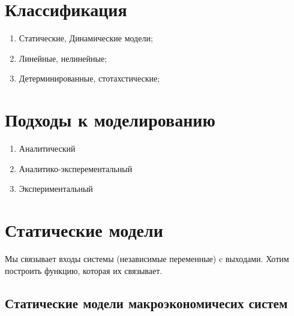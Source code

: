 \documentclass[14pt]{extarticle}
\begin{document}
	\section{Классификация}
	\begin{enumerate}
		\item Статические, Динамические модели;
		\item Линейные, нелинейные;
		\item Детерминированные, стотахстические;
	\end{enumerate}
	\section{Подходы к моделированию}
	\begin{enumerate}
		\item Аналитический
		\item Аналитико-эксперементальный
		\item Экспериментальный
	\end{enumerate}
	\section{Статические модели}
	Мы связывает входы системы (независимые переменные) c
	выходами. Хотим построить функцию, которая их связывает.
	\subsection{Статические модели макроэкономичесих систем}
\end{document}
